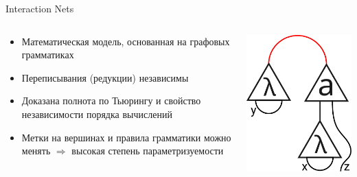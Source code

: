 \documentclass[aspectratio=169]{beamer}
\begin{document}
\begin{frame}{Interaction Nets}

    \begin{columns}
        \begin{column}{0.65\linewidth}
            \begin{itemize}
                \item Математическая модель, основанная на графовых грамматиках
                \item Переписывания (редукции) независимы
                \item Доказана полнота по Тьюрингу и свойство независимости порядка вычислений
                \item Метки на вершинах и правила грамматики можно менять $\Rightarrow$ высокая степень параметризуемости
            \end{itemize}
        \end{column}
        \begin{column}{0.3\linewidth}
            \includegraphics[width=\linewidth]{pictures/lamda-graph.pdf}
        \end{column}
    \end{columns}
\end{frame}
\end{document}
